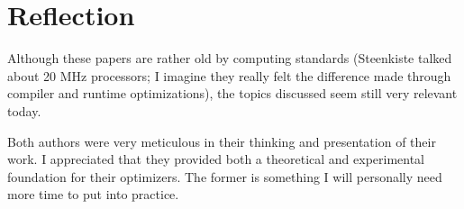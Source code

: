 \documentclass[12pt,letterpaper]{article}
\begin{document}
\section*{Reflection}

Although these papers are rather old by computing standards (Steenkiste talked
about 20 MHz processors; I imagine they really felt the difference made through
compiler and runtime optimizations), the topics discussed seem still very
relevant today.

Both authors were very meticulous in their thinking and presentation of their
work. I appreciated that they provided both a theoretical and experimental
foundation for their optimizers. The former is something I will personally need
more time to put into practice.



\end{document}
